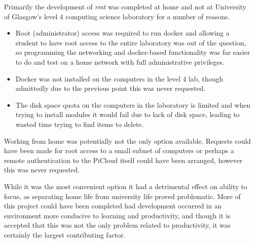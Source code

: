 Primarily the development of \emph{rmt} was completed at home and not at University of Glasgow's level 4 computing science laboratory for a number of reasons.

\begin{itemize}
	\item Root (administrator) access was required to run docker and allowing a student to have root access to the entire laboratory was out of the question, so programming the networking and docker-based functionality was far easier to do and test on a home network with full administrative privileges.
	\item Docker was not installed on the computers in the level 4 lab, though admittedly due to the previous point this was never requested.
	\item The disk space quota on the computers in the laboratory is limited and when trying to install modules it would fail due to lack of disk space, leading to wasted time trying to find items to delete.
\end{itemize}

Working from home was potentially not the only option available.
Requests could have been made for root access to a small subnet of computers or perhaps a remote authentication to the PiCloud itself could have been arranged, however this was never requested.

While it was the most convenient option it had a detrimental effect on ability to focus, as separating home life from university life proved problematic.
More of this project could have been completed had development occurred in an environment more conducive to learning and productivity, and though it is accepted that this was not the only problem related to productivity, it was certainly the largest contributing factor.